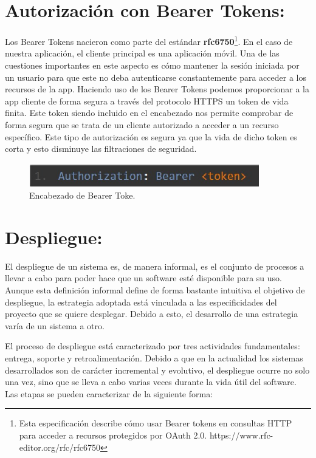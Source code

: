 \section{Autorización con Bearer Tokens:}
Los Bearer Tokens nacieron como parte del estándar \textbf{rfc6750}\footnote{Esta especificación describe cómo usar Bearer tokens en consultas HTTP para acceder a recursos protegidos por OAuth 2.0. https://www.rfc-editor.org/rfc/rfc6750}.  En el caso de nuestra aplicación, el cliente principal es una aplicación móvil. Una de las cuestiones importantes en este aspecto es cómo mantener la sesión iniciada por un usuario para que este no deba autenticarse constantemente para acceder a los recursos de la app. Haciendo uso de los Bearer Tokens podemos proporcionar a la app cliente de forma segura a través del protocolo HTTPS un token de vida finita. Este token siendo incluido en el encabezado nos permite comprobar de forma segura que se trata de un cliente autorizado a acceder a un recurso específico. Este tipo de autorización es segura ya que la vida de dicho token es corta y esto disminuye las filtraciones de seguridad.
\begin{figure}[H]
	\centering
	\includegraphics[width = 10cm]{Graphics/bearer_token.jpg}
	\caption{Encabezado de Bearer Toke. }
	\label{fig:bearer_tokne}
\end{figure}

\section{Despliegue:}

El despliegue de un sistema es, de manera informal, es el conjunto de procesos a llevar a cabo para poder hace que un software esté disponible para su uso. Aunque esta definición informal define de forma bastante intuitiva el objetivo de despliegue, la estrategia adoptada está vinculada a las especificidades del proyecto que se quiere desplegar. Debido a esto, el desarrollo de una estrategia varía de un sistema a otro.
\newline


El proceso de despliegue está caracterizado por tres actividades fundamentales: entrega, soporte y retroalimentación. Debido a que en la actualidad los sistemas desarrollados son de carácter incremental y evolutivo, el despliegue ocurre no solo una vez, sino que se lleva a cabo varias veces durante la vida útil del software. Las etapas se pueden caracterizar de la siguiente forma:

